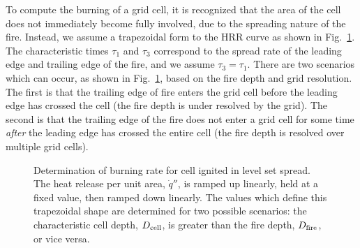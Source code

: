 To compute the burning of a grid cell, it is recognized that the area of the cell does not immediately become fully involved, due to the spreading nature of the fire. Instead, we assume a trapezoidal form to the HRR curve as shown in Fig.~\ref{fig:LS_burning_rate}. The characteristic times $\tau_1$ and $\tau_3$ correspond to the spread rate of the leading edge and trailing edge of the fire, and we assume $\tau_3 = \tau_1$. There are two scenarios which can occur, as shown in Fig.~\ref{fig:LS_burning_rate}, based on the fire depth and grid resolution. The first is that the trailing edge of fire enters the grid cell before the leading edge has crossed the cell (the fire depth is under resolved by the grid). The second is that the trailing edge of the fire does not enter a grid cell for some time {\it after} the leading edge has crossed the entire cell (the fire depth is resolved over multiple grid cells).

\begin{figure}
    \begin{center}
        \caption[Determination of burning rate for cell ignited in level set spread]{\label{fig:LS_burning_rate} Determination of burning rate for cell ignited in level set spread. The heat release per unit area, $\dot{q}''$, is ramped up linearly, held at a fixed value, then ramped down linearly. The values which define this trapezoidal shape are determined for two possible scenarios: the characteristic cell depth, $D_{\rm cell}$, is greater than the fire depth, $D_{\rm fire}$, or vice versa.}
    \end{center}
\end{figure}

